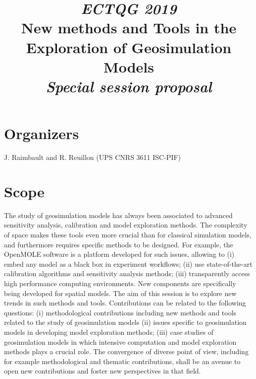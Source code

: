 \documentclass[11pt]{article}
\begin{document}
% 



\title{
\textit{ECTQG 2019}\medskip\\
New methods and Tools in the Exploration of Geosimulation Models\medskip\\
\textit{Special session proposal}
}

\date{}

\maketitle

\justify





\section*{Organizers}

J. Raimbault and R. Reuillon (UPS CNRS 3611 ISC-PIF)


\section*{Scope}

The study of geosimulation models has always been associated to advanced sensitivity analysis, calibration and model exploration methods. The complexity of space makes these tools even more crucial than for classical simulation models, and furthermore requires specific methods to be designed. For example, the OpenMOLE software is a platform developed for such issues, allowing to (i) embed any model as a black box in experiment workflows; (ii) use state-of-the-art calibration algorithms and sensitivity analysis methods; (iii) transparently access high performance computing environments. New components are specifically being developed for spatial models. The aim of this session is to explore new trends in such methods and tools. Contributions can be related to the following questions: (i) methodological contributions including new methods and tools related to the study of geosimulation models (ii) issues specific to geosimulation models in developing model exploration methods; (iii) case studies of geosimulation models in which intensive computation and model exploration methods plays a crucial role. The convergence of diverse point of view, including for example methodological and thematic contributions, shall be an avenue to open new contributions and foster new perspectives in that field.
\end{document}
